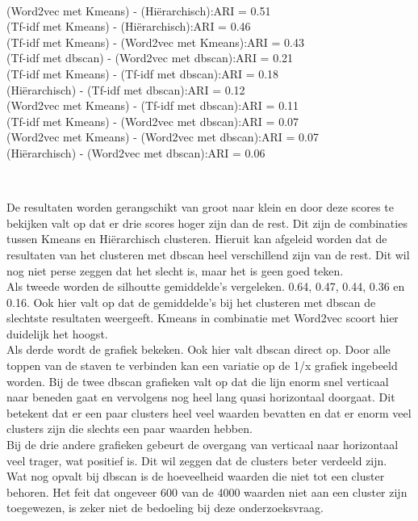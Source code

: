 \\\indent(Word2vec met Kmeans) - (Hiërarchisch):\hfill ARI = 0.51
\\\indent(Tf-idf met Kmeans) - (Hiërarchisch):\hfill ARI = 0.46
\\\indent(Tf-idf met Kmeans) - (Word2vec met Kmeans):\hfill ARI = 0.43
\\\indent(Tf-idf met dbscan) - (Word2vec met dbscan):\hfill ARI = 0.21
\\\indent(Tf-idf met Kmeans) - (Tf-idf met dbscan):\hfill ARI = 0.18
\\\indent(Hiërarchisch) - (Tf-idf met dbscan):\hfill ARI = 0.12
\\\indent(Word2vec met Kmeans) - (Tf-idf met dbscan):\hfill ARI = 0.11
\\\indent(Tf-idf met Kmeans) - (Word2vec met dbscan):\hfill ARI = 0.07
\\\indent(Word2vec met Kmeans) - (Word2vec met dbscan):\hfill ARI = 0.07
\\\indent(Hiërarchisch) - (Word2vec met dbscan):\hfill ARI = 0.06

\\\indent

De resultaten worden gerangschikt van groot naar klein en door deze scores te bekijken valt op dat er drie scores hoger zijn dan de rest. Dit zijn de combinaties tussen Kmeans en Hiërarchisch clusteren. Hieruit kan afgeleid worden dat de resultaten van het clusteren met dbscan heel verschillend zijn van de rest. Dit wil nog niet perse zeggen dat het slecht is, maar het is geen goed teken.
\\\indent
Als tweede worden de silhoutte gemiddelde's vergeleken. 0.64, 0.47, 0.44, 0.36 en 0.16. Ook hier valt op dat de gemiddelde's bij het clusteren met dbscan de slechtste resultaten weergeeft. Kmeans in combinatie met Word2vec scoort hier duidelijk het hoogst.
\\\indent
Als derde wordt de grafiek bekeken. Ook hier valt dbscan direct op. Door alle toppen van de staven te verbinden kan een variatie op de 1/x grafiek ingebeeld worden. Bij de twee dbscan grafieken valt op dat die lijn enorm snel verticaal naar beneden gaat en vervolgens nog heel lang quasi horizontaal doorgaat. Dit betekent dat er een paar clusters heel veel waarden bevatten en dat er enorm veel clusters zijn die slechts een paar waarden hebben.
\\\indent
Bij de drie andere grafieken gebeurt de overgang van verticaal naar horizontaal veel trager, wat positief is. Dit wil zeggen dat de clusters beter verdeeld zijn.
\\\indent
Wat nog opvalt bij dbscan is de hoeveelheid waarden die niet tot een cluster behoren. Het feit dat ongeveer 600 van de 4000 waarden niet aan een cluster zijn toegewezen, is zeker niet de bedoeling bij deze onderzoeksvraag.
\\\indent



